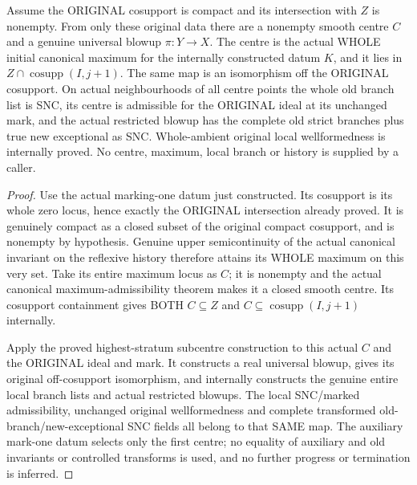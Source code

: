 \begin{theorem}
\label{hir:nc-intrinsic-original-marked-first-centre}
Assume the ORIGINAL cosupport is compact and its intersection with $Z$ is
nonempty. From only these original data there are a nonempty smooth centre
$C$ and a genuine universal blowup $\pi:Y\to X$. The centre is the actual
WHOLE initial canonical maximum for the internally constructed datum $K$,
and it lies in $Z\cap\operatorname{cosupp}(I,j+1)$. The same map is an
isomorphism off the ORIGINAL cosupport. On actual neighbourhoods of all
centre points the whole old branch list is SNC, its centre is admissible
for the ORIGINAL ideal at its unchanged mark, and the actual restricted
blowup has the complete old strict branches plus true new exceptional as
SNC. Whole-ambient original local wellformedness is internally proved.
No centre, maximum, local branch or history is supplied by a caller.
\leanok
\end{theorem}
\begin{proof}
Use the actual marking-one datum just constructed. Its cosupport is its
whole zero locus, hence exactly the ORIGINAL intersection already proved.
It is genuinely compact as a closed subset of the original compact
cosupport, and is nonempty by hypothesis. Genuine upper semicontinuity of
the actual canonical invariant on the reflexive history therefore attains
its WHOLE maximum on this very set. Take its entire maximum locus as $C$;
it is nonempty and the actual canonical maximum-admissibility theorem
makes it a closed smooth centre. Its cosupport containment gives BOTH
$C\subseteq Z$ and $C\subseteq\operatorname{cosupp}(I,j+1)$ internally.

Apply the proved highest-stratum subcentre construction to this actual
$C$ and the ORIGINAL ideal and mark. It constructs a real universal
blowup, gives its original off-cosupport isomorphism, and internally
constructs the genuine entire local branch lists and actual restricted
blowups. The local SNC/marked admissibility, unchanged original
wellformedness and complete transformed old-branch/new-exceptional SNC
fields all belong to that SAME map. The auxiliary mark-one datum selects
only the first centre; no equality of auxiliary and old invariants or
controlled transforms is used, and no further progress or termination is
inferred.
\end{proof}
